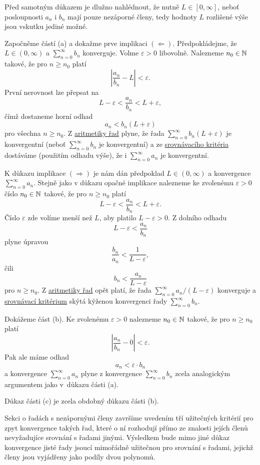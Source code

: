 \begin{thmproof}
 Před samotným důkazem je dlužno nahlédnout, že nutně $L \in [0,\infty]$, neboť
 posloupnosti $a_n$ i $b_n$ mají pouze nezáporné členy, tedy hodnoty $L$
 rozlišené výše jsou vskutku jediné možné.

 Započněme částí (a) a dokažme prve implikaci $( \Leftarrow )$. Předpokládejme,
 že $L \in (0,\infty)$ a $\sum_{n = 0}^{\infty} b_n$ konverguje. Volme
 $\varepsilon>0$ libovolně. Nalezneme $n_0 \in \mathbb{N}$ takové, že pro $n \geq n_0$
 platí
 \[
  \left| \frac{a_n}{b_n} - L \right| < \varepsilon.
 \]
 První nerovnost lze přepsat na
 \[
  L - \varepsilon < \frac{a_n}{b_n} < L + \varepsilon,
 \]
 čímž dostaneme horní odhad
 \[
  a_n < b_n(L + \varepsilon)
 \]
 pro všechna $n \geq n_0$. Z \hyperref[prop:aritmetika-ciselnych-rad]{aritmetiky
 řad} plyne, že řada $\sum_{n = 0}^{\infty} b_n(L + \varepsilon)$ je
 konvergentní (neboť $\sum_{n = 0}^{\infty} b_n$ je konvergentní) a ze
 \hyperref[prop:srovnavaci-kriterium]{srovnávacího kritéria} dostáváme (použitím
 odhadu výše), že i $\sum_{n = 0}^{\infty} a_n$ je konvergentní.

 K důkazu implikace $( \Rightarrow )$ je nám dán předpoklad $L \in (0,\infty)$ a
 konvergence $\sum_{n = 0}^{\infty} a_n$. Stejně jako v důkazu opačné implikace
 nalezneme ke zvolenému $\varepsilon>0$ číslo $n_0 \in \mathbb{N}$ takové, že pro $n
 \geq n_0$ platí 
 \[
  L - \varepsilon < \frac{a_n}{b_n} < L + \varepsilon.
 \]
 Číslo $\varepsilon$ zde volíme menší než $L$, aby platilo $L - \varepsilon >
 0$. Z dolního odhadu
 \[
  L - \varepsilon < \frac{a_n}{b_n}
 \]
 plyne úpravou
 \[
  \frac{b_n}{a_n} < \frac{1}{L-\varepsilon},
 \]
 čili
 \[
  b_n < \frac{a_n}{L-\varepsilon}
 \]
 pro $n \geq n_0$. Z \hyperref[prop:aritmetika-ciselnych-rad]{aritmetiky řad}
 opět platí, že řada $\sum_{n = 0}^{\infty} a_n / (L-\varepsilon)$ konverguje a
 \hyperref[prop:srovnavaci-kriterium]{srovnávací kritérium} skýtá kýženou
 konvergenci řady $\sum_{n = 0}^{\infty} b_n$.

 Dokážeme část (b). Ke zvolenému $\varepsilon>0$ nalezneme $n_0 \in \mathbb{N}$ takové,
 že pro $n \geq n_0$ platí
 \[
  \left| \frac{a_n}{b_n} - 0 \right| < \varepsilon.
 \]
 Pak ale máme odhad
 \[
  a_n < \varepsilon \cdot b_n
 \]
 a konvergence $\sum_{n = 0}^{\infty} a_n$ plyne z konvergence $\sum_{n =
 0}^{\infty} b_n$ zcela analogickým argumentem jako v~důkazu části (a).

 Důkaz části (c) je zcela obdobný důkazu části (b).
\end{thmproof}

Sekci o řadách s nezápornými členy završíme uvedením tří užitečných kritérií pro
zpyt konvergence takých řad, které o ní rozhodují přímo ze znalosti jejích
členů nevyžadujíce srovnání s řadami jinými. Výsledkem bude mimo jiné důkaz
konvergence jisté řady jsoucí mimořádně užitečnou pro srovnání s řadami, jejichž
členy jsou vyjádřeny jako podíly dvou polynomů.


